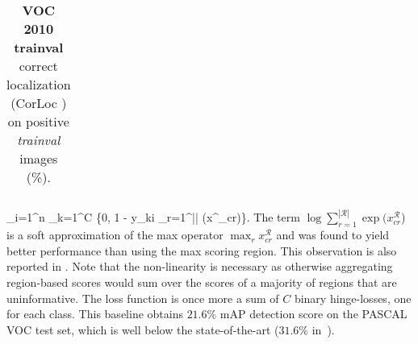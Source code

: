 \documentclass[10pt,twocolumn,letterpaper]{article}
\begin{document}
\begin{table*}[t!]
{\begin{tabular}{@{}L{3.5cm}|*{20}{x}|x@{}}
  \end{tabular}
  }
  \vspace{0.2em}
  \caption{{\bf VOC 2010 trainval} correct localization (CorLoc \cite{Deselaers12}) on positive \textit{trainval} images (\%).}
  \vspace{2em}
  \label{tab:voc2010corloc}
\end{table*}%
\sum_{i=1}^n
\sum_{k=1}^C
\max\{0, 1 - y_{ki} \log \sum_{r=1}^{||} \exp(x^{}_{cr})\}.
\]
The term $\log \sum_{r=1}^{|\mathcal{R}|} \exp(x^{\mathcal{R}}_{cr}$) is a soft approximation of the max operator $\max_r x_{cr}^\mathcal{R}$ and was found to yield better performance than using the max scoring region. This observation is also reported in \cite{Bilen14}. Note that the non-linearity is necessary as otherwise aggregating region-based scores would sum over the scores of a majority of regions that are uninformative. The loss function is once more a sum of $C$ binary hinge-losses, one for each class. This baseline obtains $21.6 \%$ mAP detection score on the PASCAL VOC test set, which is well below the state-of-the-art ($31.6 \%$ in~\cite{Wang14a}).
\end{document}
